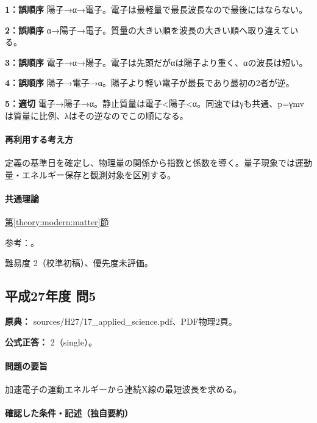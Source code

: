 \noindent\textbf{1：誤順序} 陽子→α→電子。電子は最軽量で最長波長なので最後にはならない。\par

\noindent\textbf{2：誤順序} α→陽子→電子。質量の大きい順を波長の大きい順へ取り違えている。\par

\noindent\textbf{3：誤順序} 電子→α→陽子。電子は先頭だがαは陽子より重く、αの波長は短い。\par

\noindent\textbf{4：誤順序} 陽子→電子→α。陽子より軽い電子が最長であり最初の2者が逆。\par

\noindent\textbf{5：適切} 電子→陽子→α。静止質量は電子<陽子<α。同速ではγも共通、p=γmvは質量に比例、λはその逆なのでこの順になる。\par

\paragraph{再利用する考え方} 定義の基準日を確定し、物理量の関係から指数と係数を導く。量子現象では運動量・エネルギー保存と観測対象を区別する。

\paragraph{共通理論} \hyperref[theory:modern:matter]{第\ref*{theory:modern:matter}節}

\par 参考：\cite{os_matter}。

\par 難易度 2（校準初稿）、優先度未評価。

\subsection{平成27年度 問5}
\label{q:h27-reg-applied-05}

\noindent\textbf{原典：} sources/H27/17\_applied\_science.pdf、PDF物理2頁。

\textbf{公式正答：} 2（single）。

\paragraph{問題の要旨} 加速電子の運動エネルギーから連続X線の最短波長を求める。

\paragraph{確認した条件・記述（独自要約）}\mbox{}\par

